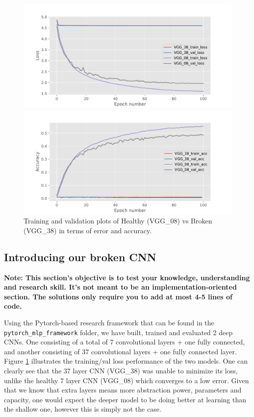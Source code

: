 \documentclass[11pt,]{article}
\begin{document}
\begin{figure}
\centering
\begin{minipage}{.5\textwidth}
  \centering
  \includegraphics[width=1.1\linewidth]{loss_plot.pdf}
\end{minipage}%
\begin{minipage}{.5\textwidth}
  \centering
  \includegraphics[width=1.1\linewidth]{accuracy_plot.pdf}
\end{minipage}
\caption{Training and validation plots of Healthy (VGG\_08) vs Broken (VGG\_38) in terms of error and accuracy.}
\label{brokenvshealthy}
\end{figure}

\subsection{Introducing our broken CNN}\label{broken-intro}


\textbf{Note: This section's objective is to test your knowledge, understanding and research skill. It's not meant to be an implementation-oriented section. The solutions only require you to add at most 4-5 lines of code.}

Using the Pytorch-based research framework that can be found in the \texttt{pytorch\_mlp\_framework} folder, we have built, trained and evaluated 2 deep CNNs. One consisting of a total of 7 convolutional layers + one fully connected, and another consisting of 37 convolutional layers + one fully connected layer. Figure \ref{brokenvshealthy} illustrates the training/val loss performance of the two models. One can clearly see that the 37 layer CNN (VGG\_38) was unable to minimize its loss, unlike the healthy 7 layer CNN (VGG\_08) which converges to a low error. Given that we know that extra layers means more abstraction power, parameters and capacity, one would expect the deeper model to be doing better at learning than the shallow one, however this is simply not the case. 
\end{document}
